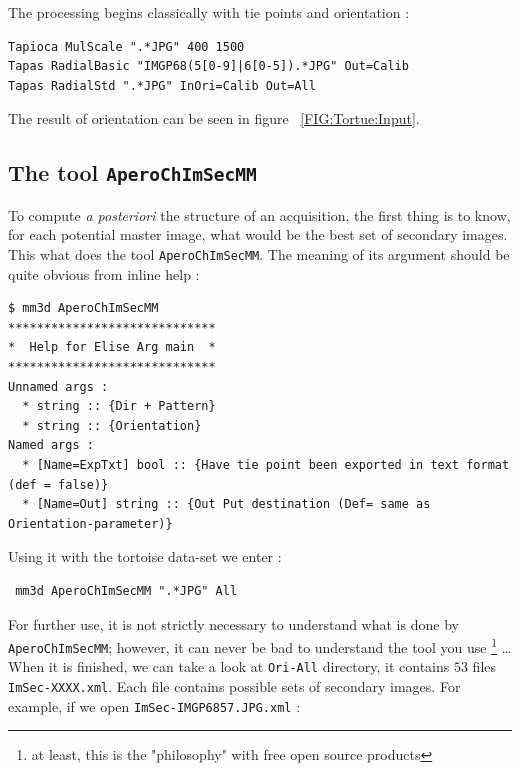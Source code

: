 The processing begins classically with tie points and orientation :

\begin{verbatim}
Tapioca MulScale ".*JPG" 400 1500
Tapas RadialBasic "IMGP68(5[0-9]|6[0-5]).*JPG" Out=Calib
Tapas RadialStd ".*JPG" InOri=Calib Out=All
\end{verbatim}

The result of orientation can be seen in figure ~\ref{FIG:Tortue:Input}.



\subsection{The tool {\tt AperoChImSecMM}}

To compute \emph{a posteriori} the structure of an acquisition, the first thing is to know,
for each potential master image, what would be the best set of secondary  images.
This what does the tool {\tt AperoChImSecMM}. The meaning of its argument should be
quite obvious from inline help :

\begin{verbatim}
$ mm3d AperoChImSecMM
*****************************
*  Help for Elise Arg main  *
*****************************
Unnamed args : 
  * string :: {Dir + Pattern}
  * string :: {Orientation}
Named args : 
  * [Name=ExpTxt] bool :: {Have tie point been exported in text format (def = false)}
  * [Name=Out] string :: {Out Put destination (Def= same as Orientation-parameter)}
\end{verbatim}

Using it with the tortoise data-set we enter :

\begin{verbatim}
 mm3d AperoChImSecMM ".*JPG" All 
\end{verbatim}

For further use, it is not strictly necessary to understand what is done
 by {\tt AperoChImSecMM}; however, it  can never be bad  to understand the tool you use
\footnote{at least, this is the "philosophy" with free open source products} \dots 
When it is finished, we can take a look at  {\tt Ori-All} directory, it
contains $53$ files  {\tt ImSec-XXXX.xml}. Each file contains possible sets of secondary images.
For example, if we open {\tt ImSec-IMGP6857.JPG.xml}  :

